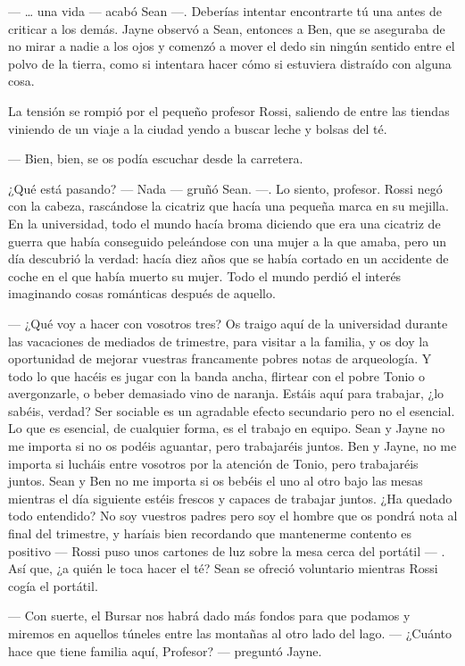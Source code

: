 --- \ldots{} una vida --- acabó Sean ---. Deberías intentar encontrarte
tú una antes de criticar a los demás. Jayne observó a Sean, entonces a
Ben, que se aseguraba de no mirar a nadie a los ojos y comenzó a mover
el dedo sin ningún sentido entre el polvo de la tierra, como si
intentara hacer cómo si estuviera distraído con alguna cosa.

La tensión se rompió por el pequeño profesor Rossi, saliendo de entre
las tiendas viniendo de un viaje a la ciudad yendo a buscar leche y
bolsas del té.

--- Bien, bien, se os podía escuchar desde la carretera.

¿Qué está pasando? --- Nada --- gruñó Sean. ---. Lo siento, profesor.
Rossi negó con la cabeza, rascándose la cicatriz que hacía una pequeña
marca en su mejilla. En la universidad, todo el mundo hacía broma
diciendo que era una cicatriz de guerra que había conseguido peleándose
con una mujer a la que amaba, pero un día descubrió la verdad: hacía
diez años que se había cortado en un accidente de coche en el que había
muerto su mujer. Todo el mundo perdió el interés imaginando cosas
románticas después de aquello.

--- ¿Qué voy a hacer con vosotros tres? Os traigo aquí de la universidad
durante las vacaciones de mediados de trimestre, para visitar a la
familia, y os doy la oportunidad de mejorar vuestras francamente pobres
notas de arqueología. Y todo lo que hacéis es jugar con la banda ancha,
flirtear con el pobre Tonio o avergonzarle, o beber demasiado vino de
naranja. Estáis aquí para trabajar, ¿lo sabéis, verdad? Ser sociable es
un agradable efecto secundario pero no el esencial. Lo que es esencial,
de cualquier forma, es el trabajo en equipo. Sean y Jayne no me importa
si no os podéis aguantar, pero trabajaréis juntos. Ben y Jayne, no me
importa si lucháis entre vosotros por la atención de Tonio, pero
trabajaréis juntos. Sean y Ben no me importa si os bebéis el uno al otro
bajo las mesas mientras el día siguiente estéis frescos y capaces de
trabajar juntos. ¿Ha quedado todo entendido? No soy vuestros padres pero
soy el hombre que os pondrá nota al final del trimestre, y haríais bien
recordando que mantenerme contento es positivo --- Rossi puso unos
cartones de luz sobre la mesa cerca del portátil --- . Así que, ¿a quién
le toca hacer el té? Sean se ofreció voluntario mientras Rossi cogía el
portátil.

--- Con suerte, el Bursar nos habrá dado más fondos para que podamos y
miremos en aquellos túneles entre las montañas al otro lado del lago.
--- ¿Cuánto hace que tiene familia aquí, Profesor? --- preguntó Jayne.

